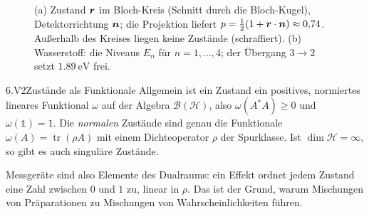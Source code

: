 \begin{figure}[h]
  
  \caption{ (a) Zustand $\boldsymbol{r}$ im
  Bloch-Kreis (Schnitt durch die Bloch-Kugel), Detektorrichtung $\boldsymbol{n}$; die Projektion
  liefert $p=\tfrac12(1+\boldsymbol{r}\cdot\boldsymbol{n})\approx 0{,}74$. Außerhalb des Kreises liegen
  keine Zustände (schraffiert). (b) Wasserstoff: die Niveaus $E_n$ für $n=1,\dots,4$; der Übergang
  $3\to2$ setzt $\qty{1.89}{\electronvolt}$ frei.}
  \label{fig:born}
\end{figure}

\begin{pkgtracktwo}{6.V2}{Zustände als Funktionale}
Allgemein ist ein Zustand ein positives, normiertes lineares Funktional $\omega$ auf der Algebra
$\mathcal{B}(\mathcal{H})$, also $\omega(A^{*}A)\geq 0$ und $\omega(\mathbb{1})=1$. Die
\emph{normalen} Zustände sind genau die Funktionale $\omega(A)=\operatorname{tr}(\rho A)$ mit einem
Dichteoperator $\rho$ der Spurklasse. Ist $\dim\mathcal{H}=\infty$, so gibt es auch singuläre Zustände.
\end{pkgtracktwo}

Messgeräte sind also Elemente des Dualraums: ein Effekt ordnet jedem Zustand eine Zahl zwischen
$0$ und $1$ zu, linear in $\rho$. Das ist der Grund, warum Mischungen von Präparationen zu
Mischungen von Wahrscheinlichkeiten führen.
